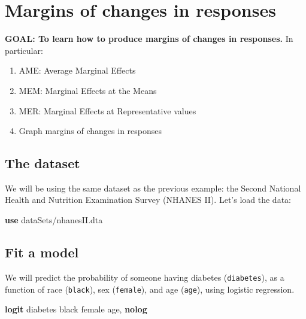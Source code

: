 \documentclass[
]{book}
\newenvironment{Shaded}{\begin{snugshade}}{\end{snugshade}}
\newcommand{\BaseNTok}[1]{\textcolor[rgb]{0.00,0.00,0.81}{#1}}
\newcommand{\KeywordTok}[1]{\textcolor[rgb]{0.13,0.29,0.53}{\textbf{#1}}}
\newcommand{\NormalTok}[1]{#1}
\providecommand{\tightlist}{%
  \setlength{\itemsep}{0pt}\setlength{\parskip}{0pt}}
\begin{document}
\hypertarget{margins-of-changes-in-responses}{%
\section{Margins of changes in responses}\label{margins-of-changes-in-responses}}

\begin{alert}

\textbf{GOAL: To learn how to produce margins of changes in responses.} In particular:

\begin{enumerate}
\def\labelenumi{\arabic{enumi}.}
\tightlist
\item
  AME: Average Marginal Effects
\item
  MEM: Marginal Effects at the Means
\item
  MER: Marginal Effects at Representative values
\item
  Graph margins of changes in responses
\end{enumerate}

\end{alert}

\hypertarget{the-dataset-3}{%
\subsection{The dataset}\label{the-dataset-3}}

We will be using the same dataset as the previous example: the Second National Health and Nutrition Examination Survey (NHANES II). Let's load the data:

\begin{Shaded}
\begin{Highlighting}[]
\KeywordTok{use}\NormalTok{ dataSets/nhanesII.dta}
\end{Highlighting}
\end{Shaded}

\hypertarget{fit-a-model-1}{%
\subsection{Fit a model}\label{fit-a-model-1}}

We will predict the probability of someone having diabetes (\texttt{diabetes}), as a function of race (\texttt{black}), sex (\texttt{female}), and age (\texttt{age}), using logistic regression.

\begin{Shaded}
\begin{Highlighting}[]
\KeywordTok{logit}\NormalTok{ diabetes }\BaseNTok{black}\NormalTok{ female age, }\KeywordTok{nolog} 
\end{Highlighting}
\end{Shaded}
\end{document}
